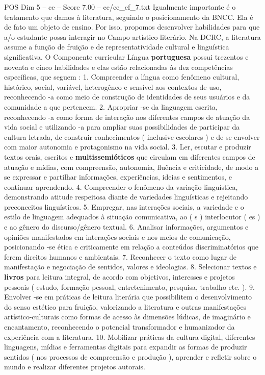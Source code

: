 \begin{textsample}{POS Dim 5 – ce – Score 7.00 – ce/ce\_ef\_7.txt}
Igualmente importante é o tratamento que damos à literatura, seguindo o posicionamento da BNCC.
Ela é de fato um objeto de ensino.
Por isso, propomos desenvolver habilidades para que a/o estudante possa interagir no Campo artístico-literário.
Na DCRC, a literatura assume a função de fruição e de representatividade cultural e linguística significativa.
O Componente curricular Língua \textbf{portuguesa} possui trezentos e noventa e cinco habilidades e elas estão relacionadas às dez competências específicas, que seguem : 1.
Compreender a língua como fenômeno cultural, histórico, social, variável, heterogêneo e sensível aos contextos de uso, reconhecendo -a como meio de construção de identidades de seus usuários e da comunidade a que pertencem. 2.
Apropriar -se da linguagem escrita, reconhecendo -a como forma de interação nos diferentes campos de atuação da vida social e utilizando -a para ampliar suas possibilidades de participar da cultura letrada, de construir conhecimentos ( inclusive escolares ) e de se envolver com maior autonomia e protagonismo na vida social. 3.
Ler, escutar e produzir textos orais, escritos e \textbf{multissemióticos} que circulam em diferentes campos de atuação e mídias, com compreensão, autonomia, fluência e criticidade, de modo a se expressar e partilhar informações, experiências, ideias e sentimentos, e continuar aprendendo. 4.
Compreender o fenômeno da variação linguística, demonstrando atitude respeitosa diante de variedades linguísticas e rejeitando preconceitos linguísticos. 5.
Empregar, nas interações sociais, a variedade e o estilo de linguagem adequados à situação comunicativa, ao ( s ) interlocutor ( es ) e ao gênero do discurso/gênero textual. 6.
Analisar informações, argumentos e opiniões manifestados em interações sociais e nos meios de comunicação, posicionando -se ética e criticamente em relação a conteúdos discriminatórios que ferem direitos humanos e ambientais. 7.
Reconhecer o texto como lugar de manifestação e negociação de sentidos, valores e ideologias. 8.
Selecionar textos e \textbf{livros} para leitura integral, de acordo com objetivos, interesses e projetos pessoais ( estudo, formação pessoal, entretenimento, pesquisa, trabalho etc. ). 9.
Envolver -se em práticas de leitura literária que possibilitem o desenvolvimento do senso estético para fruição, valorizando a literatura e outras manifestações artístico-culturais como formas de acesso às dimensões lúdicas, de imaginário e encantamento, reconhecendo o potencial transformador e humanizador da experiência com a literatura. 10.
Mobilizar práticas da cultura digital, diferentes linguagens, mídias e ferramentas digitais para expandir as formas de produzir sentidos ( nos processos de compreensão e produção ), aprender e refletir sobre o mundo e realizar diferentes projetos autorais.

\end{textsample}
